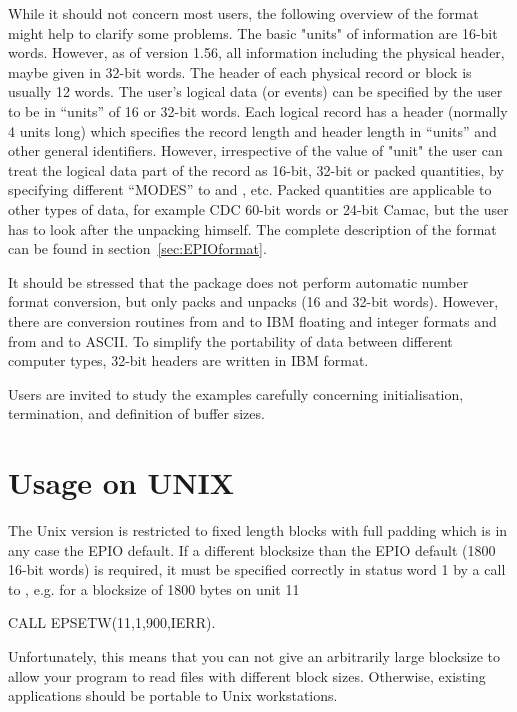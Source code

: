 While it should not concern most users, the following overview of
the format might help to clarify some problems. The basic "units"
of information are 16-bit words. However, as of version 1.56, all
information including the physical header, maybe given in 32-bit words.
The header of each
physical record or block is usually 12 words. The user's logical
data (or events) can be specified by the user to be in ``units'' of 16 or
32-bit words. Each logical record has a header (normally 4 units long)
which specifies the record length and header length in ``units'' and other
general identifiers. However, irrespective of the value of "unit" the user
can treat the logical data part of the record as 16-bit, 32-bit
or packed quantities, by specifying different ``MODES'' to  and
, etc. 
Packed quantities are applicable to other types of data,
for example CDC 60-bit words or 24-bit Camac, but the user has to
look after the unpacking himself. The complete description of the
format can be found in section~\ref{sec:EPIOformat}.
 
It should be stressed that the package does not perform automatic
number format conversion, but only packs and unpacks (16 and 32-bit
words). However, there are conversion routines from and to IBM floating
and integer formats and from and to ASCII. To simplify the portability
of data between different computer types, 32-bit headers are written
in IBM format.
 
Users are invited to study the examples carefully concerning
initialisation, termination, and definition of buffer sizes.

\section{Usage on UNIX}
\label{sec:usageunix}

The Unix version is restricted to fixed length blocks with full
padding which is in any case the EPIO default.
If a different blocksize than the EPIO default (1800 16-bit words)
is required, it must be specified correctly in status word 1 by a
call to , e.g. for a blocksize of 1800 bytes on unit 11
\begin{XMP}
 CALL EPSETW(11,1,900,IERR).
\end{XMP}
Unfortunately, this means that you can not give an arbitrarily large
blocksize to allow your program to read files with different block
sizes.
Otherwise, existing applications should be portable to Unix
workstations.
 
